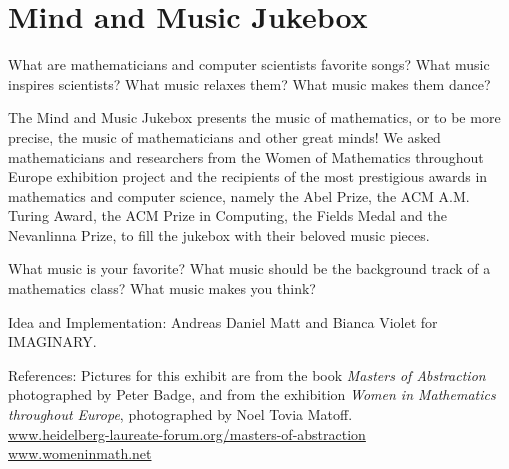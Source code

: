 \section{Mind and Music Jukebox}
What are mathematicians and computer scientists favorite songs? What music inspires scientists? What music relaxes them? What music makes them dance?

The Mind and Music Jukebox presents the music of mathematics, or to be more precise, the music of mathematicians and other great minds! We asked mathematicians and researchers from the Women of Mathematics throughout Europe exhibition project and the recipients of the most prestigious awards in mathematics and computer science, namely the Abel Prize, the ACM A.M. Turing Award, the ACM Prize in Computing, the Fields Medal and the Nevanlinna Prize, to fill the jukebox with their beloved music pieces.

What music is your favorite? What music should be the background track of a mathematics class? What music makes you think?

\begin{sectcredits}
\item[Idea and Implementation:] Andreas Daniel Matt and Bianca Violet for IMAGINARY.

\item[References:] 
Pictures for this exhibit are from the book \emph{Masters of Abstraction} photographed by Peter Badge, and from the exhibition \emph{Women in Mathematics throughout Europe}, photographed by Noel Tovia Matoff.
\\ \url{www.heidelberg-laureate-forum.org/masters-of-abstraction}
\\ \url{www.womeninmath.net}

\end{sectcredits}
